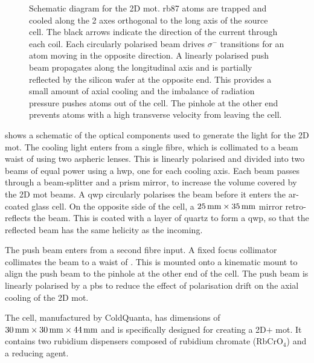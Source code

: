 \begin{figure}[!htbp]
	\centering
	\def\svgwidth{0.5\textwidth}
	
	\caption[Schematic for the 2D \ac{mot}]{Schematic diagram for the 2D \ac{mot}. \ac{rb87} atoms are trapped and cooled along the 2 axes orthogonal to the long axis of the source cell. The black arrows indicate the direction of the current through each coil. Each circularly polarised beam drives \(\sigma^-\) transitions for an atom moving in the opposite direction. A linearly polarised push beam propagates along the longitudinal axis and is partially reflected by the silicon wafer at the opposite end. This provides a small amount of axial cooling and the imbalance of radiation pressure pushes atoms out of the cell. The pinhole at the other end prevents atoms with a high transverse velocity from leaving the cell.}
	\label{fig:2D_mot_diagram}
\end{figure}
 shows a schematic of the optical
components used to generate the light for the 2D \ac{mot}. The cooling
light enters from a single
fibre, which is collimated to a beam waist of
 using two aspheric lenses. This is
linearly polarised and divided
into two beams of equal power using a \ac{hwp}, one for each cooling
axis. Each beam passes
through a beam-splitter and a prism mirror, to increase the volume
covered by
the 2D \ac{mot} beams. A \ac{qwp} circularly polarises the beam before
it enters the ar-coated glass cell. On the opposite side of the cell, a
\(\sivalue{25}{\milli\metre} \times \sivalue{35}{\milli\metre}\) mirror retro-reflects the beam. This is coated with a layer of quartz to form a \ac{qwp}, so that the
reflected beam has the same helicity as the incoming.
\par\noindent 
The push beam enters from a second fibre input. A fixed focus collimator collimates
the beam to a waist of . This is mounted onto a
 kinematic mount to align the push beam to the  pinhole at the other end of the cell. The push beam is linearly polarised by a \ac{pbs} to reduce the effect of
polarisation drift on the axial cooling of the 2D \ac{mot}. 
\par\noindent
The cell,
manufactured by ColdQuanta, has dimensions of \(\sivalue{30}{\milli\metre}
\times \sivalue{30}{\milli\metre} \times \sivalue{44}{\milli\metre}\) and is
specifically designed for creating a 2D\(+\) \ac{mot}. It contains two rubidium
dispensers composed of rubidium chromate (RbCrO\(_4\)) and a reducing agent.

